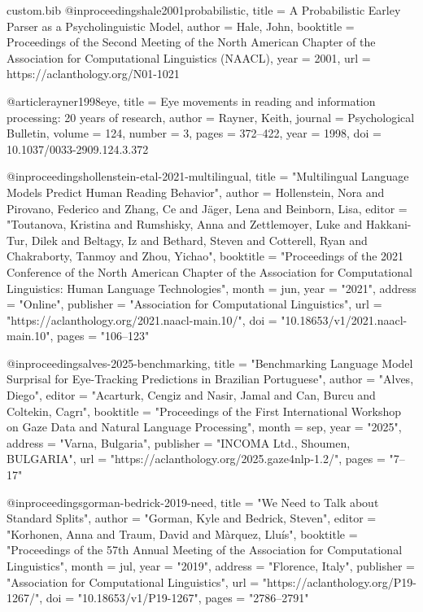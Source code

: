 \begin{filecontents*}[overwrite]{custom.bib}
@inproceedings{hale2001probabilistic,
  title        = {A Probabilistic {Earley} Parser as a Psycholinguistic Model},
  author       = {Hale, John},
  booktitle    = {Proceedings of the Second Meeting of the North American Chapter of the Association for Computational Linguistics (NAACL)},
  year         = {2001},
  url          = {https://aclanthology.org/N01-1021}
}

@article{rayner1998eye,
  title        = {Eye movements in reading and information processing: 20 years of research},
  author       = {Rayner, Keith},
  journal      = {Psychological Bulletin},
  volume       = {124},
  number       = {3},
  pages        = {372--422},
  year         = {1998},
  doi          = {10.1037/0033-2909.124.3.372}
}

@inproceedings{hollenstein-etal-2021-multilingual,
    title = "Multilingual Language Models Predict Human Reading Behavior",
    author = {Hollenstein, Nora  and
      Pirovano, Federico  and
      Zhang, Ce  and
      J{\"a}ger, Lena  and
      Beinborn, Lisa},
    editor = "Toutanova, Kristina  and
      Rumshisky, Anna  and
      Zettlemoyer, Luke  and
      Hakkani-Tur, Dilek  and
      Beltagy, Iz  and
      Bethard, Steven  and
      Cotterell, Ryan  and
      Chakraborty, Tanmoy  and
      Zhou, Yichao",
    booktitle = "Proceedings of the 2021 Conference of the North American Chapter of the Association for Computational Linguistics: Human Language Technologies",
    month = jun,
    year = "2021",
    address = "Online",
    publisher = "Association for Computational Linguistics",
    url = "https://aclanthology.org/2021.naacl-main.10/",
    doi = "10.18653/v1/2021.naacl-main.10",
    pages = "106--123"
}

@inproceedings{alves-2025-benchmarking,
    title = "Benchmarking Language Model Surprisal for Eye-Tracking Predictions in {B}razilian {P}ortuguese",
    author = "Alves, Diego",
    editor = "Acarturk, Cengiz  and
      Nasir, Jamal  and
      Can, Burcu  and
      Coltekin, Cagr{\i}",
    booktitle = "Proceedings of the First International Workshop on Gaze Data and Natural Language Processing",
    month = sep,
    year = "2025",
    address = "Varna, Bulgaria",
    publisher = "INCOMA Ltd., Shoumen, BULGARIA",
    url = "https://aclanthology.org/2025.gaze4nlp-1.2/",
    pages = "7--17"
}

@inproceedings{gorman-bedrick-2019-need,
    title = "We Need to Talk about Standard Splits",
    author = "Gorman, Kyle  and
      Bedrick, Steven",
    editor = "Korhonen, Anna  and
      Traum, David  and
      M{\`a}rquez, Llu{\'i}s",
    booktitle = "Proceedings of the 57th Annual Meeting of the Association for Computational Linguistics",
    month = jul,
    year = "2019",
    address = "Florence, Italy",
    publisher = "Association for Computational Linguistics",
    url = "https://aclanthology.org/P19-1267/",
    doi = "10.18653/v1/P19-1267",
    pages = "2786--2791"
}


\end{filecontents*}
